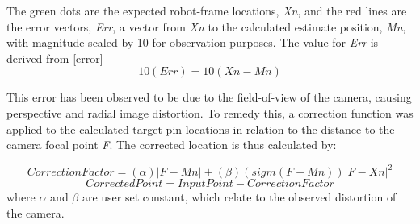 \documentclass[11pt,a4paper, margin=1in]{report}
\begin{document}
The green dots are the expected robot-frame locations, \textit{Xn}, and the red lines are the error vectors, \textit{Err}, a vector from \textit{Xn} to the calculated estimate position, \textit{Mn}, with magnitude scaled by 10 for observation purposes. The value for \textit{Err} is derived from \cref{error} \begin{equation}10(Err) = 10(Xn-Mn) \label{error}\end{equation}

This error has been observed to be due to the field-of-view of the camera, causing perspective and radial image distortion. To remedy this, a correction function was applied to the calculated target pin locations in relation to the distance to the camera focal point \textit{F}. The corrected location is thus calculated by:

\begin{equation}
CorrectionFactor = (\alpha)|F-Mn| + (\beta)(sigm(F-Mn))|F-Xn|^2
\end{equation} 
\begin{equation}
CorrectedPoint = InputPoint - CorrectionFactor
\end{equation} 
where $\alpha$ and $\beta$ are user set constant, which relate to the observed distortion of the camera.\\
\end{document}
